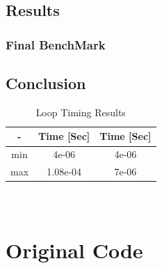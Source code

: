 \documentclass[]{article}%
\begin{document}
\subsection{Results}

\subsubsection{Final BenchMark}



\subsection{Conclusion}


\begin{table}[ht]
\caption{Loop Timing Results}
\centering
\begin{tabular}{c c c}
\hline\hline
 - & Time [Sec] &  Time [Sec] \\ [0.5ex] 
\hline
min & 4e-06 & 4e-06 \\ 
max & 1.08e-04 & 7e-06\\

\hline
\end{tabular}
\label{table:norm_high}
\end{table} 





\newpage
\appendix
\section{\\Original Code} \label{App:AppendixA}

{\small














}


%
%
\end{document}
